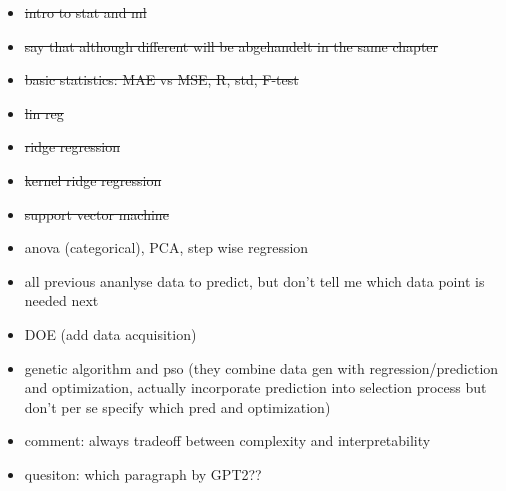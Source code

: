 \begin{itemize}
    \item \sout{intro to stat and ml}
    \item \sout{say that although different will be abgehandelt in the same chapter}
    \item \sout{basic statistics: MAE vs MSE, R, std, F-test} 
    \item \sout{lin reg}
    \item \sout{ridge regression}
    \item \sout{kernel ridge regression}
    \item \sout{support vector machine}
    \item anova (categorical), PCA, step wise regression
    \item all previous ananlyse data to predict, but don't tell me which data point is needed next 
    \item DOE (add data acquisition)
    \item genetic algorithm and pso (they combine data gen with regression/prediction and optimization, actually incorporate prediction into selection process but don't per se specify which pred and optimization)
    \item comment: always tradeoff between complexity and interpretability
    \item quesiton: which paragraph by GPT2?? 
\end{itemize}

